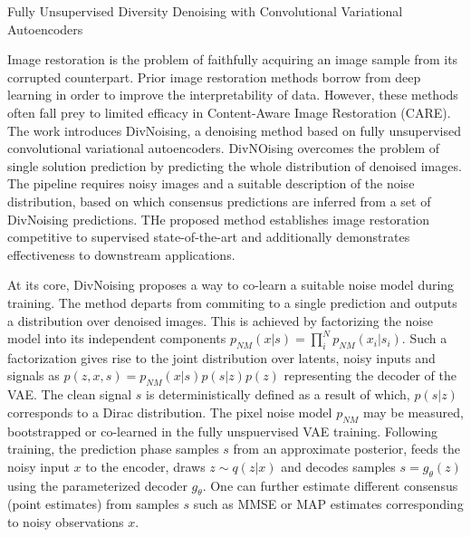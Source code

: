 \documentclass[11pt,letterpaper]{article}
\begin{document}
\begin{center}
  \large{Fully Unsupervised Diversity Denoising with Convolutional Variational Autoencoders}
\end{center}


Image restoration is the problem of faithfully acquiring an image sample from its corrupted counterpart. Prior image restoration methods borrow from deep learning in order to improve the interpretability of data. However, these methods often fall prey to limited efficacy in Content-Aware Image Restoration (CARE). The work introduces DivNoising, a denoising method based on fully unsupervised convolutional variational autoencoders. DivNOising overcomes the problem of single solution prediction by predicting the whole distribution of denoised images. The pipeline requires noisy images and a suitable description of the noise distribution, based on which consensus predictions are inferred from a set of DivNoising predictions. THe proposed method establishes image restoration competitive to supervised state-of-the-art and additionally demonstrates effectiveness to downstream applications. 

At its core, DivNoising proposes a way to co-learn a suitable noise model during training. The method departs from commiting to a single prediction and outputs a distribution over denoised images. This is achieved by factorizing the noise model into its independent components $p_{NM}(x|s) = \prod_{i}^{N}p_{NM}(x_{i}|s_{i})$. Such a factorization gives rise to the joint distribution over latents, noisy inputs and signals as $p(z,x,s) = p_{NM}(x|s)p(s|z)p(z)$ representing the decoder of the VAE. The clean signal $s$ is deterministically defined as a result of which, $p(s|z)$ corresponds to a Dirac distribution. The pixel noise model $p_{NM}$ may be measured, bootstrapped or co-learned in the fully unspuervised VAE training. Following training, the prediction phase samples $s$ from an approximate posterior, feeds the noisy input $x$ to the encoder, draws $z \sim q(z|x)$ and decodes samples $s = g_{\theta}(z)$ using the parameterized decoder $g_{\theta}$. One can further estimate different consensus (point estimates) from samples $s$ such as MMSE or MAP estimates corresponding to noisy observations $x$.
\end{document}
